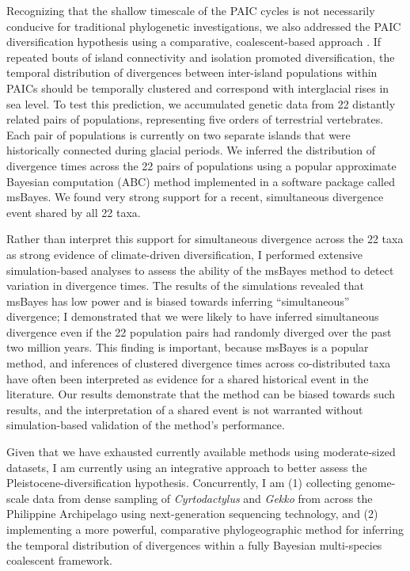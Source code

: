 \documentclass[10pt]{article}
\begin{document}
Recognizing that the shallow timescale of the PAIC cycles is not necessarily
conducive for traditional phylogenetic investigations, we also addressed the
PAIC diversification hypothesis using a comparative, coalescent-based approach
.
If repeated bouts of island connectivity and isolation promoted
diversification, the temporal distribution of divergences between inter-island
populations within PAICs should be temporally clustered and correspond with
interglacial rises in sea level.
To test this prediction, we accumulated genetic data from 22 distantly related
pairs of populations, representing five orders of terrestrial vertebrates.
Each pair of populations is currently on two separate islands that were
historically connected during glacial periods.
We inferred the distribution of divergence times across the 22 pairs of
populations using a popular approximate Bayesian computation (ABC) method
implemented in a software package called msBayes.
We found very strong support
for a recent, simultaneous divergence event shared by all 22 taxa.

Rather than interpret this support for simultaneous divergence across the 22
taxa as strong evidence of climate-driven diversification, I performed
extensive simulation-based analyses to assess the ability of the msBayes method
to detect variation in divergence times.
The results of the simulations revealed that msBayes has low power and is
biased towards inferring ``simultaneous'' divergence; I demonstrated that we
were likely to have inferred simultaneous divergence even if the 22 population
pairs had randomly diverged over the past two million years.
This finding is important, because msBayes is a popular method, and inferences
of clustered divergence times across co-distributed taxa have often been
interpreted as evidence for a shared historical event in the literature.
Our results demonstrate that the method can be biased towards such results, and
the interpretation of a shared event is not warranted without simulation-based
validation of the method's performance.

Given that we have exhausted currently available methods using moderate-sized
datasets, I am currently using an integrative approach to better assess the
Pleistocene-diversification hypothesis.  Concurrently, I am (1) collecting
genome-scale data from dense sampling of \emph{Cyrtodactylus} and \emph{Gekko}
from across the Philippine Archipelago using next-generation sequencing
technology, and (2) implementing a more powerful, comparative phylogeographic
method for inferring the temporal distribution of divergences within a fully
Bayesian multi-species coalescent framework.
\end{document}
